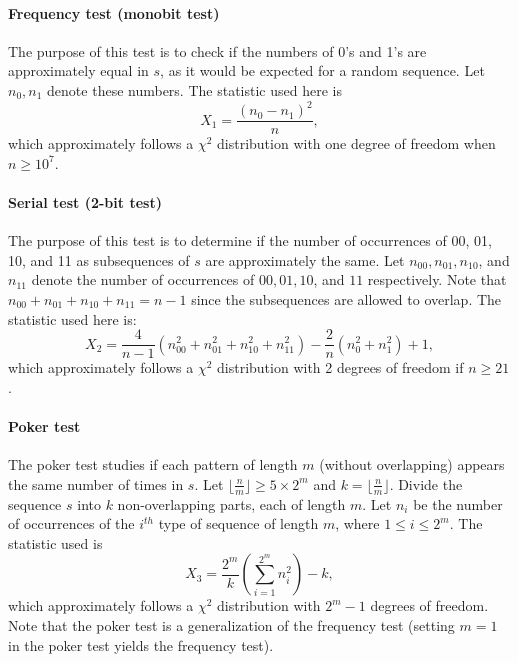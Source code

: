 \paragraph{Frequency test (monobit test)}

The purpose of this test is to check if the numbers of 0's and 1's are approximately equal in $s$, as it would be expected for a random sequence. Let $n_0, n_1$ denote these numbers. The statistic used here is 
\begin{equation*}
X_1=\frac{(n_0-n_1)^2}{n}, 
\end{equation*}
which approximately follows a $\chi^2$ distribution with one degree of freedom when $n\geqslant 10^7$.

\paragraph{Serial test (2-bit test)}

The purpose of this test is to determine if the number of occurrences of 00, 01, 10, and 11 as subsequences of $s$ are approximately the same. Let $n_{00} , n_{01} ,n_{10}$, and $n_{11}$ denote the number of occurrences of $00, 01, 10$, and $11$ respectively. Note that $n_{00} + n_{01} + n_{10} + n_{11} = n-1$ since the subsequences are allowed to overlap. The
statistic used here is:
\begin{equation*}
X_2=\frac{4}{n-1}(n_{00}^2+n_{01}^2+n_{10}^2+n_{11}^2)-\frac{2}{n}(n_0^2+n_1^2)+1,
\end{equation*}
 which approximately follows a $\chi^2$ distribution with 2 degrees of freedom if $n\geqslant 21$.

\paragraph{Poker test}

The poker test studies if each pattern of length $m$ (without overlapping) appears the same number of times in $s$. Let $\lfloor \frac{n}{m} \rfloor\geqslant 5 \times 2^m$ and $k= \lfloor \frac{n}{m} \rfloor $. Divide the sequence $s$ into $k$ non-overlapping parts, each of length $m$. Let $n_i$ be the number of occurrences of the $i^{th}$ type of sequence of length $m$, where $1 \leqslant i \leqslant 2^m$. The statistic used is 
\begin{equation*}
X_3=\dfrac{2^m}{k}\left(\displaystyle{\sum^{2^m}_{i=1}n^2_i}\right)-k,
\end{equation*}
which approximately follows a $\chi^2$ distribution with $2^m-1$ degrees of freedom. Note that the poker test is a generalization of the frequency test (setting $m = 1$ in the poker test yields the frequency test).

